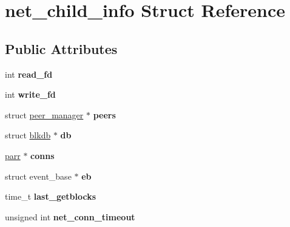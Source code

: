 \hypertarget{structnet__child__info}{\section{net\-\_\-child\-\_\-info Struct Reference}
\label{structnet__child__info}
}
\subsection*{Public Attributes}
\begin{DoxyCompactItemize}
\item 
\hypertarget{structnet__child__info_aeb7c2e6b362b783a45f642b6657adb79}{int {\bfseries read\-\_\-fd}}\label{structnet__child__info_aeb7c2e6b362b783a45f642b6657adb79}

\item 
\hypertarget{structnet__child__info_a20f055e9469d205f63767478eb8b43d3}{int {\bfseries write\-\_\-fd}}\label{structnet__child__info_a20f055e9469d205f63767478eb8b43d3}

\item 
\hypertarget{structnet__child__info_a7d118ac5f9e703fc6683c85f924bcd23}{struct \hyperlink{structpeer__manager}{peer\-\_\-manager} $\ast$ {\bfseries peers}}\label{structnet__child__info_a7d118ac5f9e703fc6683c85f924bcd23}

\item 
\hypertarget{structnet__child__info_a65d7885acd7789351ccc097880bf9914}{struct \hyperlink{structblkdb}{blkdb} $\ast$ {\bfseries db}}\label{structnet__child__info_a65d7885acd7789351ccc097880bf9914}

\item 
\hypertarget{structnet__child__info_a6127de1099cbce59bc0d5c405999203b}{\hyperlink{structparr}{parr} $\ast$ {\bfseries conns}}\label{structnet__child__info_a6127de1099cbce59bc0d5c405999203b}

\item 
\hypertarget{structnet__child__info_a75b27e2f53a4706ccfb9b5ca876f223e}{struct event\-\_\-base $\ast$ {\bfseries eb}}\label{structnet__child__info_a75b27e2f53a4706ccfb9b5ca876f223e}

\item 
\hypertarget{structnet__child__info_a26f00d62cd7687ce83caad7377596b67}{time\-\_\-t {\bfseries last\-\_\-getblocks}}\label{structnet__child__info_a26f00d62cd7687ce83caad7377596b67}

\item 
\hypertarget{structnet__child__info_a2aec83e11d8c71f10fe1288e6648a800}{unsigned int {\bfseries net\-\_\-conn\-\_\-timeout}}\label{structnet__child__info_a2aec83e11d8c71f10fe1288e6648a800}


\end{DoxyCompactItemize}
